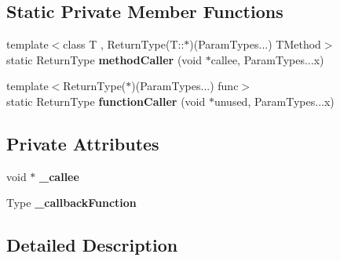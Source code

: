 \subsection*{Static Private Member Functions}
\begin{DoxyCompactItemize}
\item 
{\footnotesize template$<$class T , Return\+Type(\+T\+::$\ast$)(\+Param\+Types...) T\+Method$>$ }\\static Return\+Type {\bfseries method\+Caller} (void $\ast$callee, Param\+Types...\+x)\hypertarget{class_ensum_1_1_utils_1_1_delegate_3_01_return_type_07_param_types_8_8_8_08_4_ab53d0e5bf351106f729586c144cd58bb}{}\label{class_ensum_1_1_utils_1_1_delegate_3_01_return_type_07_param_types_8_8_8_08_4_ab53d0e5bf351106f729586c144cd58bb}

\item 
{\footnotesize template$<$Return\+Type($\ast$)(\+Param\+Types...) func$>$ }\\static Return\+Type {\bfseries function\+Caller} (void $\ast$unused, Param\+Types...\+x)\hypertarget{class_ensum_1_1_utils_1_1_delegate_3_01_return_type_07_param_types_8_8_8_08_4_ad7f1896a49be7b6312d9d4329d1f1622}{}\label{class_ensum_1_1_utils_1_1_delegate_3_01_return_type_07_param_types_8_8_8_08_4_ad7f1896a49be7b6312d9d4329d1f1622}

\end{DoxyCompactItemize}
\subsection*{Private Attributes}
\begin{DoxyCompactItemize}
\item 
void $\ast$ {\bfseries \+\_\+callee}\hypertarget{class_ensum_1_1_utils_1_1_delegate_3_01_return_type_07_param_types_8_8_8_08_4_ae8a767f8412e83e09f42b3794b948c33}{}\label{class_ensum_1_1_utils_1_1_delegate_3_01_return_type_07_param_types_8_8_8_08_4_ae8a767f8412e83e09f42b3794b948c33}

\item 
Type {\bfseries \+\_\+callback\+Function}\hypertarget{class_ensum_1_1_utils_1_1_delegate_3_01_return_type_07_param_types_8_8_8_08_4_a31d7af1a08f4a32e3cb8a065de77d743}{}\label{class_ensum_1_1_utils_1_1_delegate_3_01_return_type_07_param_types_8_8_8_08_4_a31d7af1a08f4a32e3cb8a065de77d743}

\end{DoxyCompactItemize}


\subsection{Detailed Description}
